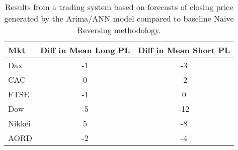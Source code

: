 \begin{table}[ht]
\centering
\caption[Arima/ANN predictions passed to System 1 compared to Naive Reversing methodology]{Results from a trading system based on forecasts of closing price generated by the Arima/ANN model compared to baseline Naive Reversing methodology.} 
\label{tab:chp_ts:arima_ann_sys1_diff}
\begin{tabular}{lcc}
  \toprule Mkt & Diff in Mean Long PL & Diff in Mean Short PL \\ 
  \midrule Dax & -1 & -3 \\ 
  CAC & 0 & -2 \\ 
  FTSE & -1 & 0 \\ 
  Dow & -5 & -12 \\ 
  Nikkei & 5 & -8 \\ 
  AORD & -2 & -4 \\ 
   \bottomrule \end{tabular}
\end{table}
